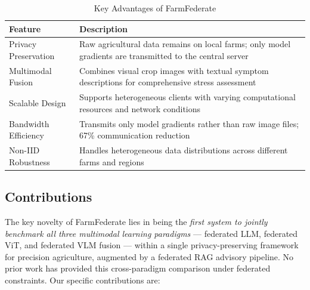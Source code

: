 \documentclass[conference]{IEEEtran}
\begin{document}
\begin{table}[t]
\caption{Key Advantages of FarmFederate}
\label{tab:advantages}
\centering\footnotesize
\begin{tabular}{p{1.5cm}p{5.8cm}}
\toprule
\textbf{Feature} & \textbf{Description}\\
\midrule
Privacy Preservation & Raw agricultural data remains on local farms; only model
  gradients are transmitted to the central server \\
Multimodal Fusion & Combines visual crop images with textual symptom descriptions
  for comprehensive stress assessment \\
Scalable Design & Supports heterogeneous clients with varying computational
  resources and network conditions \\
Bandwidth Efficiency & Transmits only model gradients rather than raw image files;
  67\% communication reduction \\
Non-IID Robustness & Handles heterogeneous data distributions across different
  farms and regions \\
\bottomrule
\end{tabular}
\end{table}

\subsection{Contributions}

The key novelty of FarmFederate lies in being the \emph{first system to jointly
benchmark all three multimodal learning paradigms} — federated LLM, federated ViT,
and federated VLM fusion — within a single privacy-preserving framework for precision
agriculture, augmented by a federated RAG advisory pipeline. No prior work has provided
this cross-paradigm comparison under federated constraints. Our specific contributions are:
\end{document}
